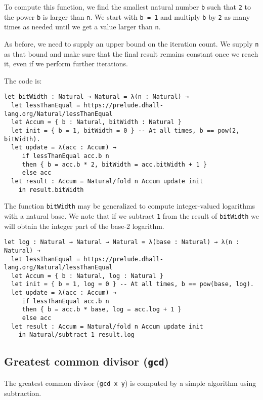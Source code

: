 To compute this function, we find the smallest natural number \lstinline!b! such that \lstinline!2! to the power \lstinline!b! is larger than \lstinline!n!. We start with \lstinline!b = 1! and multiply \lstinline!b! by \lstinline!2! as many times as needed until we get a value larger than \lstinline!n!.


As before, we need to supply an upper bound on the iteration count.
We supply \lstinline!n! as that bound and make sure that the final result remains constant once we reach it, even if we perform further iterations.


The code is:


\begin{lstlisting}[language=Dhall]
let bitWidth : Natural → Natural = λ(n : Natural) →
  let lessThanEqual = https://prelude.dhall-lang.org/Natural/lessThanEqual
  let Accum = { b : Natural, bitWidth : Natural }
  let init = { b = 1, bitWidth = 0 } -- At all times, b == pow(2, bitWidth).
  let update = λ(acc : Accum) →
     if lessThanEqual acc.b n
     then { b = acc.b * 2, bitWidth = acc.bitWidth + 1 }
     else acc 
  let result : Accum = Natural/fold n Accum update init
    in result.bitWidth 
\end{lstlisting}


The function \lstinline!bitWidth! may be generalized to compute integer-valued logarithms with a natural base.
We note that if we subtract \lstinline!1! from the result of \lstinline!bitWidth! we will obtain the integer part of the base-2 logarithm.


\begin{lstlisting}[language=Dhall]
let log : Natural → Natural → Natural = λ(base : Natural) → λ(n : Natural) →
  let lessThanEqual = https://prelude.dhall-lang.org/Natural/lessThanEqual
  let Accum = { b : Natural, log : Natural }
  let init = { b = 1, log = 0 } -- At all times, b == pow(base, log).
  let update = λ(acc : Accum) →
     if lessThanEqual acc.b n
     then { b = acc.b * base, log = acc.log + 1 }
     else acc 
  let result : Accum = Natural/fold n Accum update init
    in Natural/subtract 1 result.log
\end{lstlisting}


\subsection{Greatest common divisor (\lstinline!gcd!)}


The greatest common divisor (\lstinline!gcd x y!) is computed by a simple algorithm using subtraction.


